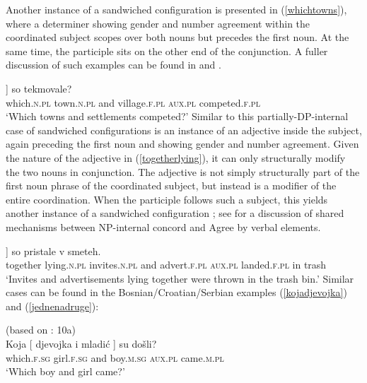 \documentclass[output=paper
,modfonts
,nonflat]{langsci/langscibook}
\begin{document}
Another instance of a sandwiched configuration is presented in (\ref{whichtowns}), where a determiner showing gender and number agreement within the coordinated subject scopes over both nouns but precedes the first noun. At the same time, the participle sits on the other end of the conjunction. A fuller discussion of such examples can be found in \cite{begovicaljovic:15} and \cite{aljovicbegovic:16}. 

\ea \label{whichtowns}
\gll [ Katera [ mesta in vasi ]] so tekmovale?  \\
{} which.\textsc{n.pl} {} town.\textsc{n.pl} and village.\textsc{f.pl} {} \textsc{aux.pl} competed.\textsc{f.pl}\\
\glt `Which towns and settlements competed?'
\z
Similar to this partially-DP-internal case of sandwiched configurations is an instance of an adjective inside the subject, again preceding the first noun and showing gender and number agreement. Given the nature of the adjective in (\ref{togetherlying}), it can only structurally modify the two nouns in conjunction. The adjective is not simply  structurally part of the first noun phrase of the coordinated subject, but instead is a modifier of the entire coordination. When the participle follows such a subject, this yields another instance of a sandwiched configuration \citep{marusicetalnels:15}; see  for a discussion of shared mechanisms between NP-internal concord and Agree by verbal elements.

\ea \label{togetherlying}
\gll [ Skupaj  ležeča   [ vabila         in    reklame ]] so      pristale     v  smeteh. \\
{} together lying.\textsc{n.pl} {} invites.\textsc{n.pl} and advert.\textsc{f.pl} {} \textsc{aux.pl} landed.\textsc{f.pl} in trash\\
\glt `Invites and advertisements lying together were thrown in the trash bin.'
\z
Similar cases can be found in the Bosnian/Croatian/Serbian examples (\ref{kojadjevojka}) and (\ref{jednenadruge}):

\ea \label{kojadjevojka}
(based on \citealt{aljovicbegovic:16}: 10a)\\
\gll Koja [ djevojka i mladić ] su došli? \\
which.\textsc{f.sg} {} girl.\textsc{f.sg} and boy.\textsc{m.sg} {} \textsc{aux.pl} came.\textsc{m.pl}\\
\glt `Which boy and girl came?' 
\z
\end{document}
